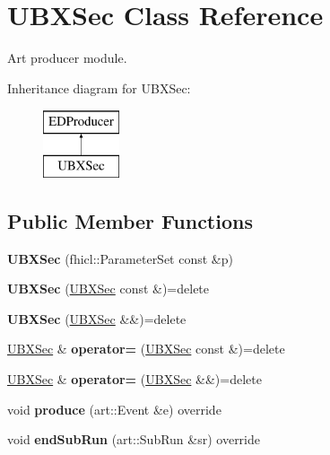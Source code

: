\hypertarget{classUBXSec}{\section{U\-B\-X\-Sec Class Reference}
\label{classUBXSec}
}


Art producer module.  


Inheritance diagram for U\-B\-X\-Sec\-:\begin{figure}[H]
\begin{center}
\leavevmode
\includegraphics[height=2.000000cm]{classUBXSec}
\end{center}
\end{figure}
\subsection*{Public Member Functions}
\begin{DoxyCompactItemize}
\item 
\hypertarget{classUBXSec_a002d19d94378dc90587c10bd4b498c4b}{{\bfseries U\-B\-X\-Sec} (fhicl\-::\-Parameter\-Set const \&p)}\label{classUBXSec_a002d19d94378dc90587c10bd4b498c4b}

\item 
\hypertarget{classUBXSec_a7605dc6971daa3828fc2cc98b118ad35}{{\bfseries U\-B\-X\-Sec} (\hyperlink{classUBXSec}{U\-B\-X\-Sec} const \&)=delete}\label{classUBXSec_a7605dc6971daa3828fc2cc98b118ad35}

\item 
\hypertarget{classUBXSec_ac34a81c60372754002552bff0c9a2764}{{\bfseries U\-B\-X\-Sec} (\hyperlink{classUBXSec}{U\-B\-X\-Sec} \&\&)=delete}\label{classUBXSec_ac34a81c60372754002552bff0c9a2764}

\item 
\hypertarget{classUBXSec_a77d35a5e1f8ddd85190e0c78bb125229}{\hyperlink{classUBXSec}{U\-B\-X\-Sec} \& {\bfseries operator=} (\hyperlink{classUBXSec}{U\-B\-X\-Sec} const \&)=delete}\label{classUBXSec_a77d35a5e1f8ddd85190e0c78bb125229}

\item 
\hypertarget{classUBXSec_aa8449ecf97b4c738a60b714dd0ea181e}{\hyperlink{classUBXSec}{U\-B\-X\-Sec} \& {\bfseries operator=} (\hyperlink{classUBXSec}{U\-B\-X\-Sec} \&\&)=delete}\label{classUBXSec_aa8449ecf97b4c738a60b714dd0ea181e}

\item 
\hypertarget{classUBXSec_acf59a7243f9a826909b23b0afba59be0}{void {\bfseries produce} (art\-::\-Event \&e) override}\label{classUBXSec_acf59a7243f9a826909b23b0afba59be0}

\item 
\hypertarget{classUBXSec_ac007533fa4d198a8f83428dc15072ce7}{void {\bfseries end\-Sub\-Run} (art\-::\-Sub\-Run \&sr) override}\label{classUBXSec_ac007533fa4d198a8f83428dc15072ce7}

\end{DoxyCompactItemize}


